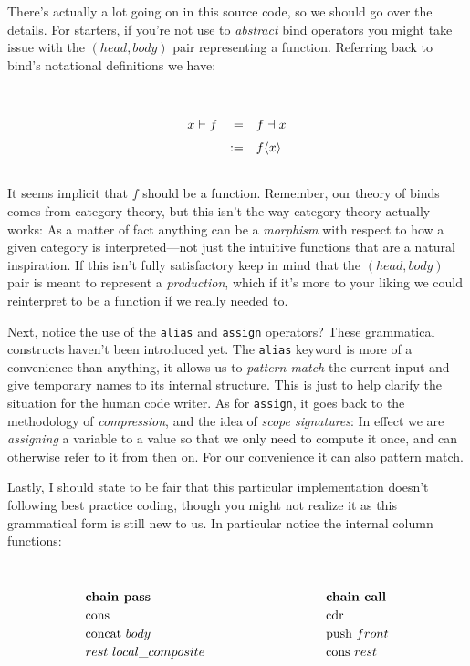 \documentclass[twoside]{article}
\newcommand{\bfmbox}[1]{\mbox{\bfseries #1}}
\newcommand{\tab}[1][1.125cm]{\hspace{#1}}
\newcommand{\col}[1][0ex]{& \hspace{#1}}
\newcommand{\cons}{\mbox{cons}}
\newcommand{\cdr}{\mbox{cdr}}
\newcommand{\push}{\mbox{push}}
\newcommand{\concat}{\mbox{concat}}
\begin{document}
There's actually a lot going on in this source code, so we should go over the details. For starters, if you're not
use to \emph{abstract} bind operators you might take issue with the $ (head, body) $ pair representing a function.
Referring back to bind's notational definitions we have:

\ \\
$$ \def\arraystretch{1.5}
\begin{array}{rrl}
x\vdash f	&  = & f\dashv x 		\\
		& := & f\langle x\rangle
\end{array} $$
\ \\

\noindent It seems implicit that $ f $ should be a function. Remember, our theory of binds comes from category theory,
but this isn't the way category theory actually works: As a matter of fact anything can be a \emph{morphism} with respect
to how a given category is interpreted---not just the intuitive functions that are a natural inspiration. If this
isn't fully satisfactory keep in mind that the $ (head, body) $ pair is meant to represent a \emph{production},
which if it's more to your liking we could reinterpret to be a function if we really needed to.

Next, notice the use of the \texttt{alias} and \texttt{assign} operators? These grammatical constructs haven't been
introduced yet. The \texttt{alias} keyword is more of a convenience than anything, it allows us to \emph{pattern match}
the current input and give temporary names to its internal structure. This is just to help clarify the situation for
the human code writer. As for \texttt{assign}, it goes back to the methodology of \emph{compression}, and the idea
of \emph{scope signatures}: In effect we are \emph{assigning} a variable to a value so that we only need to compute
it once, and can otherwise refer to it from then on. For our convenience it can also pattern match.

Lastly, I should state to be fair that this particular implementation doesn't following best practice coding, though
you might not realize it as this grammatical form is still new to us. In particular notice the internal column functions:

\ \\
$$ \def\arraystretch{1.2}
\tab[0cm] \begin{array}{ll}
\bfmbox{chain pass}		\col[3cm] \bfmbox{chain call}				\\
\cons				\col[3cm] \cdr						\\
\concat\ body			\col[3cm] \push\ front					\\
rest\ local\_composite		\col[3cm] \cons\ rest
\end{array} $$
\ \\
\end{document}
